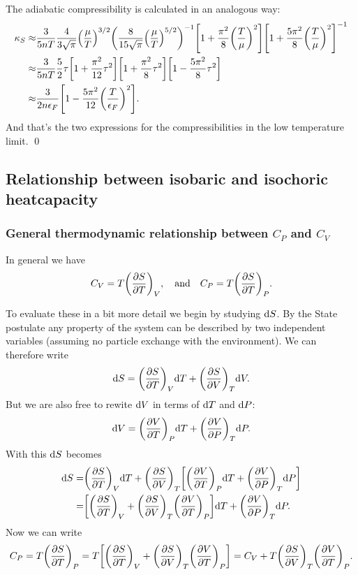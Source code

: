 \documentclass[11pt,letter, swedish, english
]{article}
\begin{document}
The adiabatic compressibility is calculated in an analogous way:
\begin{equation}
\begin{aligned}
\kappa_S\approx& \frac{3}{5nT} 
\frac{4}{3\sqrt{\pi}}\qty(\frac{\mu}{T})^{3/2}
\qty(\frac{8}{15\sqrt{\pi}}\qty(\frac{\mu}{T})^{5/2})^{-1}
\qty[
1+\frac{\pi^2}{8}\qty(\frac{T}{\mu})^2]
\qty[
1+\frac{5\pi^2}{8}\qty(\frac{T}{\mu})^2]^{-1}\\
\approx&
 \frac{3}{5nT}\frac{5}{2}\tau\qty[1 +\frac{\pi^2}{12}\tau^2]
\qty[1+\frac{\pi^2}{8}\tau^2]
\qty[1-\frac{5\pi^2}{8}\tau^2]\\
\approx&\frac{3}{2n\epsilon_F}
\qty[1 - \frac{5\pi^2}{12}\qty(\frac{T}{\epsilon_F})^2].
\end{aligned}
\end{equation}
And that's the two expressions for the compressibilities in the low
temperature limit.
\qed

\subsection{Relationship between isobaric and isochoric heatcapacity}

\subsubsection{General thermodynamic relationship between $C_P$ and $C_V$}
In general we have
\begin{equation}
C_V=T\qty(\pdv{S}{T})_V\qcomma\text{and}\quad
C_P=T\qty(\pdv{S}{T})_P.
\end{equation}

To evaluate these in a bit more detail we begin by studying
$\mathrm{d}{S}$. By the State postulate any property of the system can be
described by two independent variables (assuming no particle exchange
with the environment). We can therefore write
\begin{equation}
\mathrm{d}{S}=\qty(\pdv{S}{T})_V\mathrm{d}{T} + \qty(\pdv{S}{V})_T\mathrm{d}{V}.
\end{equation}
But we are also free to rewite $\mathrm{d}{V}$ in terms of $\mathrm{d}{T}$ and
$\mathrm{d}{P}$:
\begin{equation}
\mathrm{d}{V}=\qty(\pdv{V}{T})_P\mathrm{d}{T} + \qty(\pdv{V}{P})_T\mathrm{d}{P}.
\end{equation}
With this $\mathrm{d}{S}$ becomes
\begin{equation}
\begin{aligned}
\mathrm{d}{S} =& \qty(\pdv{S}{T})_V\mathrm{d}{T} + \qty(\pdv{S}{V})_T
\qty[\qty(\pdv{V}{T})_P\mathrm{d}{T} + \qty(\pdv{V}{P})_T\mathrm{d}{P}]\\
=&\qty[\qty(\pdv{S}{T})_V+\qty(\pdv{S}{V})_T\qty(\pdv{V}{T})_P]\mathrm{d}{T}
+ \qty(\pdv{V}{P})_T\mathrm{d}{P}.
\end{aligned}
\end{equation}
Now we can write 
\begin{equation}
C_P=T\qty(\pdv{S}{T})_P
=T\qty[\qty(\pdv{S}{T})_V+\qty(\pdv{S}{V})_T\qty(\pdv{V}{T})_P]
=C_V+T\qty(\pdv{S}{V})_T\qty(\pdv{V}{T})_P.
\end{equation}
\end{document}
